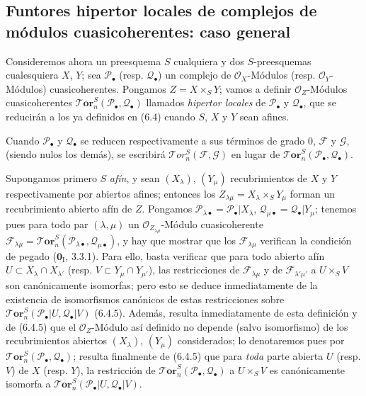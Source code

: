 \subsection{Funtores hipertor locales de complejos de módulos cuasicoherentes: caso general}
\label{subsection:III.6.5}

\begin{env}[6.5.1]
Consideremos ahora un preesquema $S$ cualquiera y dos $S$-preesquemas
cualesquiera $X$, $Y$; sea $\mathscr P_\bullet$ (resp. $\mathscr Q_\bullet$)
un complejo de $\mathscr O_X$-Módulos (resp. $\mathscr O_Y$-Módulos)
cuasicoherentes. Pongamos $Z=X\times_S Y$; vamos a definir
$\mathscr O_Z$-Módulos cuasicoherentes
$\boldsymbol{\mathscr{T}\!or}_n^S(\mathscr P_\bullet,\mathscr Q_\bullet)$ llamados
\emph{hipertor locales} de $\mathscr P_\bullet$ y $\mathscr Q_\bullet$, que se
reducirán a los ya definidos en (6.4) cuando $S$, $X$ y $Y$ sean afines.

Cuando $\mathscr P_\bullet$ y $\mathscr Q_\bullet$ se reducen
respectivamente a sus términos de grado 0, $\mathscr F$ y $\mathscr G$, (siendo
nulos los demás), se escribirá
$\mathscr{T}\!or_n^S(\mathscr F,\mathscr G)$ en lugar de
$\boldsymbol{\mathscr{T}\!or}_n^S(\mathscr P_\bullet,\mathscr Q_\bullet)$.
\end{env}

\begin{env}[6.5.2]
Supongamos primero $S$ \emph{afín}, y sean $(X_\lambda)$, $(Y_\mu)$
recubrimientos de $X$ y $Y$ respectivamente por abiertos afines; entonces los
$Z_{\lambda\mu}=X_\lambda\times_S Y_\mu$ forman un recubrimiento abierto afín
de $Z$. Pongamos
$\mathscr P_{\lambda\bullet}=\mathscr P_\bullet|X_\lambda$,
$\mathscr Q_{\mu\bullet}=\mathscr Q_\bullet|Y_\mu$; tenemos pues para todo
par $(\lambda,\mu)$ un $\mathscr O_{Z_{\lambda\mu}}$-Módulo cuasicoherente
$\mathscr F_{\lambda\mu}
  =\boldsymbol{\mathscr{T}\!or}_n^S
   (\mathscr P_{\lambda\bullet},\mathscr Q_{\mu\bullet})$,
y hay que mostrar que los $\mathscr F_{\lambda\mu}$ verifican la condición de
pegado ($\mathbf{0}_{\mathrm I}$, 3.3.1). Para ello, basta verificar que para
todo abierto afín $U\subset X_\lambda\cap X_{\lambda'}$ (resp.
$V\subset Y_\mu\cap Y_{\mu'}$), las restricciones de
$\mathscr F_{\lambda\mu}$ y de $\mathscr F_{\lambda'\mu'}$ a $U\times_S V$
son canónicamente isomorfas; pero esto se deduce inmediatamente de la existencia
de isomorfismos canónicos de estas restricciones sobre
$\boldsymbol{\mathscr{T}\!or}_n^S(\mathscr P_\bullet|U,\mathscr Q_\bullet|V)$ (6.4.5).
Además, resulta inmediatamente de esta definición y de (6.4.5) que el
$\mathscr O_Z$-Módulo así definido no depende (salvo isomorfismo) de los
recubrimientos abiertos $(X_\lambda)$, $(Y_\mu)$ considerados;
lo denotaremos pues por
$\boldsymbol{\mathscr{T}\!or}_n^S(\mathscr P_\bullet,\mathscr Q_\bullet)$; resulta finalmente
de (6.4.5) que para \emph{toda} parte abierta $U$ (resp. $V$) de $X$ (resp. $Y$), la
restricción de $\boldsymbol{\mathscr{T}\!or}_n^S(\mathscr P_\bullet,\mathscr Q_\bullet)$ a
$U\times_S V$ es canónicamente isomorfa a
$\boldsymbol{\mathscr{T}\!or}_n^S(\mathscr P_\bullet|U,\mathscr Q_\bullet|V)$.
\end{env}

